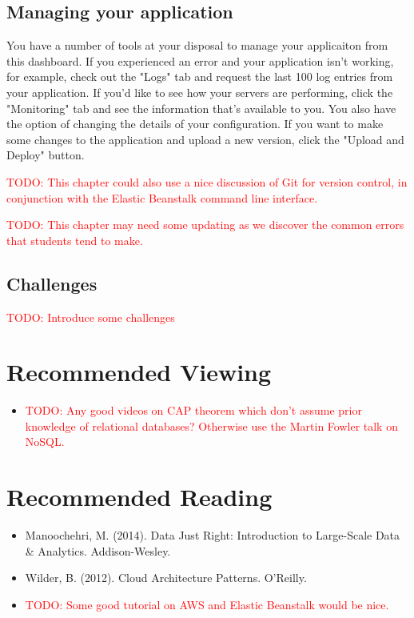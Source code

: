 \documentclass[11pt]{book}
\newcommand{\todo}[1]{\textcolor{red}{TODO: #1}} %
\begin{document}
\subsection*{Managing your application}

You have a number of tools at your disposal to manage your applicaiton from this dashboard.  If you experienced an error and your application isn't working, for example, check out the "Logs" tab and request the last 100 log entries from your application.  If you'd like to see how your servers are performing, click the "Monitoring" tab and see the information that's available to you.  You also have the option of changing the details of your configuration.  If you want to make some changes to the application and upload a new version, click the "Upload and Deploy" button.

\todo{This chapter could also use a nice discussion of Git for version control, in conjunction with the Elastic Beanstalk command line interface.}

\todo{This chapter may need some updating as we discover the common errors that students tend to make.}

\subsection*{Challenges}

\todo{Introduce some challenges}

\section*{Recommended Viewing}
\begin{itemize}
    \item \todo{Any good videos on CAP theorem which don't assume prior knowledge of relational databases?  Otherwise use the Martin Fowler talk on NoSQL.}
\end{itemize}

\section*{Recommended Reading}
\begin{itemize}
    \item Manoochehri, M. (2014). Data Just Right: Introduction to Large-Scale Data \& Analytics. Addison-Wesley.
    \item Wilder, B. (2012). Cloud Architecture Patterns. O'Reilly.
    \item \todo{Some good tutorial on AWS and Elastic Beanstalk would be nice.}
\end{itemize}
\end{document}
